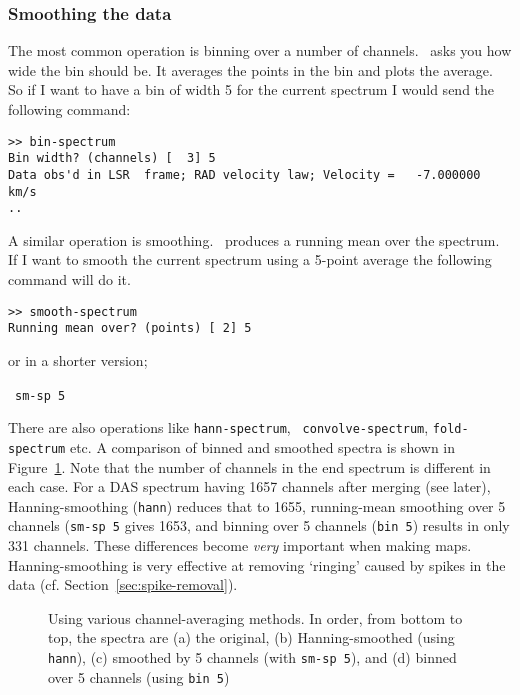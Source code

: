 \subsubsection{Smoothing the data}
\label{sec:specx_binning}
The most common operation is binning over a number of channels.
\SPECX\ asks you how wide the bin should be. It averages the points in
the bin and plots the average.  So if I want to have a bin of width 5 for
the current spectrum I would send the following command:

\begin{verbatim}
>> bin-spectrum
Bin width? (channels) [  3] 5
Data obs'd in LSR  frame; RAD velocity law; Velocity =   -7.000000     km/s
..
\end{verbatim}

A similar operation is smoothing.  \SPECX\ produces a running mean
over the spectrum.  If I want to smooth the current spectrum using a
5-point average the following command will do it.

\begin{verbatim}
>> smooth-spectrum
Running mean over? (points) [ 2] 5
\end{verbatim}

or in a shorter version;

\SP\ \verb|sm-sp 5 |

There are also operations like {\tt hann-spectrum}, {\tt
convolve-spectrum}, {\tt fold-spectrum} etc. A comparison of binned
and smoothed spectra is shown in Figure~\ref{fig:specx_smooth}. Note
that the number of channels in the end spectrum is different in each
case. For a DAS spectrum having 1657 channels after merging (see
later), Hanning-smoothing ({\tt{hann}}) reduces that to 1655,
running-mean smoothing over 5 channels ({\tt{sm-sp 5}} gives 1653, and
binning over 5 channels ({\tt{bin 5}}) results in only 331
channels. These differences become {\it very} important when making
maps. Hanning-smoothing is very effective at removing `ringing' caused
by spikes in the data (cf. Section~\ref{sec:spike-removal}).

\begin{figure}[htb]
\centering
\leavevmode
\epsfysize=3.3in
\vspace*{-0.5cm}
\begin{center}
\begin{minipage}[t]{4.5in}
\caption[Binning and smoothing spectra]
{\small{Using various channel-averaging methods. In order, from bottom
to top, the spectra are (a) the original, (b) Hanning-smoothed (using
{\tt hann}), (c) smoothed by 5 channels (with {\tt sm-sp 5}), and (d)
binned over 5 channels (using {\tt bin 5})} }
\label{fig:specx_smooth}
\end{minipage}
\end{center}
\end{figure}

